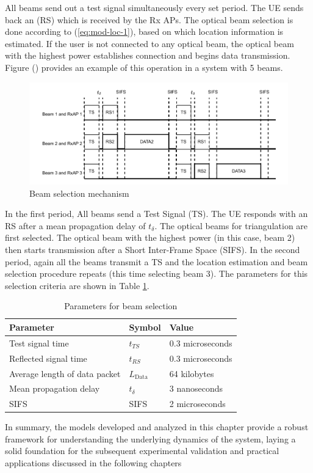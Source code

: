 All beams send out a test signal simultaneously every set period. The UE sends back an (RS) which is received by the Rx APs. The optical beam selection is done according to (\ref{eq:mod-loc-1}), based on which location information is estimated. If the user is not connected to any optical beam, the optical beam with the highest power establishes connection and begins data transmission. Figure () provides an example of this operation in a system with 5 beams. 
\begin{figure}
    \centering
    \includegraphics[width=\linewidth]{Figures/RF-OW-modeling-User localization.drawio.pdf}
    \caption{Beam selection mechanism}
    \label{fig:mod-loc-beam-ac}
\end{figure}
In the first period, All beams send a Test Signal (TS). The UE responds with an RS after a mean propagation delay of $t_\delta$. The optical beams for triangulation are first selected. The optical beam with the highest power (in this case, beam 2) then starts transmission after a Short Inter-Frame Space (SIFS). In the second period, again all the beams transmit a TS and the location estimation and beam selection procedure repeats (this time selecting beam 3).
The parameters for this selection criteria are shown in Table \ref{tab:mod-loc-params}.
\begin{table}[]
    \centering
    \begin{tabular}{|l|l|l|}
\hline
\textbf{Parameter}            & \textbf{Symbol}   & \textbf{Value}    \\ \hline
Test signal time              & $t_{TS}$          & 0.3 microseconds \\ \hline
Reflected signal time         & $t_{RS}$          & 0.3 microseconds \\ \hline
Average length of data packet\cite{khorov_tutorial_2019} & $L_{\text{Data}}$ & 64 kilobytes         \\ \hline
Mean propagation delay\cite{higgins_genetic_2009}        & $t_\delta$         & 3 nanoseconds    \\ \hline
SIFS\cite{khorov_tutorial_2019}                         & SIFS              & 2 microseconds   \\ \hline
\end{tabular}
    \caption{Parameters for beam selection\cite{zeng_vcsel_2022}}
    \label{tab:mod-loc-params}
\end{table}
\newline
\newline
In summary, the models developed and analyzed in this chapter provide a robust framework for understanding the underlying dynamics of the system, laying a solid foundation for the subsequent experimental validation and practical applications discussed in the following chapters